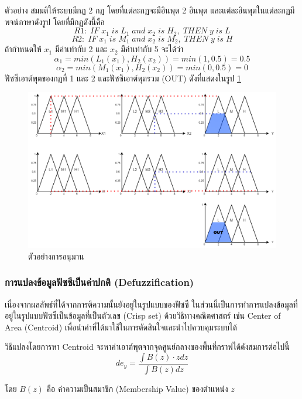 ตัวอย่าง สมมติให้ระบบมีกฏ 2 กฏ โดยที่แต่ละกฏจะมีอินพุต 2 อินพุต และแต่ละอินพุตในแต่ละกฏมีพจน์ภาษาดังรูป โดยที่มีกฏดังนี้คือ
\[R1:\; IF\; x_{1}\; is\; L_{1}\; and\; x_{2}\; is\; H_{2},\; THEN\; y\; is\; L \]
\[R2:\; IF\; x_{1}\; is\; M_{1}\; and\; x_{2}\; is\; M_{2},\; THEN\; y\; is\; H \]
ถ้ากำหนดให้ \(x_{1}\) มีค่าเท่ากับ 2 และ \(x_{2}\) มีค่าเท่ากับ 5 จะได้ว่า
\[\alpha_{1} = min(L_{1}(x_{1}),H_{2}(x_{2})) = min (1,0.5) = 0.5\]
\[\alpha_{2} = min(M_{1}(x_{1}),H_{2}(x_{2})) = min (0,0.5) = 0\]ฟัซซีเอาต์พุตของกฏที่ 1 และ 2 และฟัซซีเอาต์พุตรวม (OUT) ดังที่แสดงในรูป \ref{fig:4}
\begin{figure}[ht]
    \centering
    \includegraphics[scale=0.3]{images/ex_inference.png}
    \caption{ตัวอย่างการอนุมาน}
    \label{fig:4}
\end{figure}
\FloatBarrier

\subsubsection{การแปลงข้อมูลฟัซซีเป็นค่าปกติ (Defuzzification)}
เนื่องจากผลลัพธ์ที่ได้จากการตีความนั้นยังอยู่ในรูปแบบของฟัซซี ในส่วนนี้เป็นการทำการแปลงข้อมูลที่อยู่ในรูปแบบฟัซซีเป็นข้อมูลที่เป็นตัวเลข (Crisp set) ด้วยวิธีทางคณิตศาสตร์ เช่น Center of Area (Centroid) เพื่อนำค่าที่ได้มาใช้ในการตัดสินใจและนำไปควบคุมระบบได้ \cite{Sansanee}

วิธีแปลงโดยการหา Centroid จะหาค่าเอาต์พุตจากจุดศูนย์กลางของพื้นที่กราฟได้ดังสมการต่อไปนี้
\begin{equation}
  de_y = \frac{\int B(z)\cdot zdz}{\int B(z)dz}
  \label{eq:centroid}
\end{equation}

โดย \(B(z)\) คือ ค่าความเป็นสมาชิก (Membership Value) ของตำแหน่ง \(z\)

